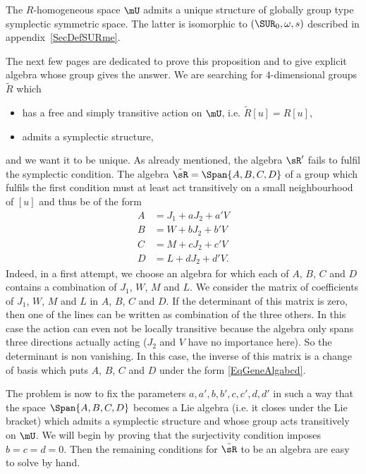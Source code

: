 \begin{proposition}
	The $R$-homogeneous space $\mU$ admits a unique structure of globally group type symplectic symmetric space. The latter is isomorphic to $(\SUR_0,\omega,s)$ described in appendix~\ref{SecDefSURme}.
	\label{GT}
\end{proposition}
The next few pages are dedicated to prove this proposition and to give explicit algebra whose group gives the answer. We are searching for $4$-dimensional groups $\tilde R$ which
\begin{itemize}
	\item has a free and simply transitive action on $\mU$, i.e. $\tilde{R}[u]=R[u]$,
	\item admits a symplectic structure,
\end{itemize}
and we want it to be unique.  As already mentioned, the algebra $\sR'$ fails to fulfil the symplectic condition. The algebra $\tilde{\sR}=\Span\{ A,B,C,D \}$ of a group which fulfils the first condition must at least act transitively on a small neighbourhood of $[u]$ and thus be of the form
\begin{subequations}  \label{EqGeneAlgabcd}
	\begin{align}
		A & =J_{1}+aJ_{2}+a'V \\
		B & =W+bJ_{2}+b'V     \\
		C & =M+cJ_{2}+c'V     \\
		D & =L+dJ_{2}+d'V.
	\end{align}
\end{subequations}
Indeed, in a first attempt, we choose an algebra for which each of $A$, $B$, $C$ and $D$ contains a combination of $J_{1}$, $W$, $M$ and $L$. We consider the matrix of coefficients of $J_{1}$, $W$, $M$ and $L$ in $A$, $B$, $C$ and $D$. If the determinant of this matrix is zero, then one of the lines can be written as combination of the three others. In this case the action can even not be locally  transitive because the algebra only spans three directions actually acting ($J_{2}$ and $V$ have no importance here). So the determinant is non vanishing. In this case, the inverse of this matrix is a change of basis which puts $A$, $B$, $C$ and $D$ under the form  \eqref{EqGeneAlgabcd}.

The problem is now to fix the parameters $a,a',b,b',c,c',d,d'$ in such a way that the space $\Span\{ A,B,C,D \}$ becomes a Lie algebra (i.e. it closes under the Lie bracket) which admits a symplectic structure and whose group acts transitively on $\mU$. We will begin by proving that the surjectivity condition imposes $b=c=d=0$. Then the remaining conditions for $\tilde \sR$ to be an algebra are easy to solve by hand.

